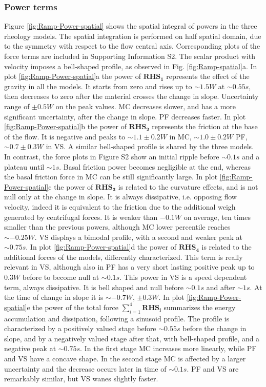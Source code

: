 \documentclass{article}
\begin{document}
\subsubsection{Power terms}
Figure \ref{fig:Ramp-Power-spatial} shows the spatial integral of powers in the three rheology models. The spatial integration is performed on half spatial domain, due to the symmetry with respect to the flow central axis. Corresponding plots of the force terms are included in Supporting Information S2. The scalar product with velocity imposes a bell-shaped profile, as observed in Fig. \ref{fig:Ramp-spatial}a. In plot \ref{fig:Ramp-Power-spatial}a the power of $\boldsymbol{RHS_1}$ represents the effect of the gravity in all the models. It starts from zero and rises up to $\sim 1.5 W$ at $\sim 0.55 s$, then decreases to zero after the material crosses the change in slope. Uncertainty range of $\pm 0.5 W$ on the peak values. MC decreases slower, and has a more significant uncertainty, after the change in slope. PF decreases faster.  In plot \ref{fig:Ramp-Power-spatial}b the power of  $\boldsymbol{RHS_2}$ represents the friction at the base of the flow. It is negative and peaks to $\sim 1.1 \pm 0.2 W$ in MC, $\sim 1.0 \pm 0.2 W$ PF, $\sim 0.7 \pm 0.3 W$ in VS. A similar bell-shaped profile is shared by the three models. In contrast, the force plots in Figure S2 show an initial ripple before $\sim 0.1 s$ and a plateau until $\sim 1 s$. Basal friction power becomes negligible at the end, whereas the basal friction force in MC can be still significantly large. In plot \ref{fig:Ramp-Power-spatial}c the power of $\boldsymbol{RHS_3}$ is related to the curvature effects, and is not null only at the change in slope. It is always dissipative, i.e. opposing flow velocity, indeed it is equivalent to the friction due to the additional weigh generated by centrifugal forces. It is weaker than $-0.1 W$ on average, ten times smaller than the previous powers, although MC lower percentile reaches $\sim -0.25 W$. VS displays a bimodal profile, with a second and weaker peak at $\sim 0.75 s$. In plot \ref{fig:Ramp-Power-spatial}d the power of $\boldsymbol{RHS_4}$ is related to the additional forces of the models, differently characterized. This term is really relevant in VS, although also in PF has a very short lasting positive peak up to $0.3 W$ before to become null at $\sim 0.1 s$. This power in VS is a speed dependent term, always dissipative. It is bell shaped and null before $\sim 0.1 s$ and after $\sim 1 s$. At the time of change in slope it is $\sim -0.7 W$, $\pm 0.3 W$. In plot \ref{fig:Ramp-Power-spatial}e the power of the total force $\sum^4_{i=1}\boldsymbol{RHS_i}$ summarizes the energy accumulation and dissipation, following a sinusoid profile. The profile is characterized by a positively valued stage before $\sim 0.55 s$ before the change in slope, and by a negatively valued stage after that, with bell-shaped profile, and a negative peak at $\sim 0.75 s$. In the first stage MC increases more linearly, while PF and VS have a concave shape. In the second stage MC is affected by a larger uncertainty and the decrease occurs later in time of $\sim 0.1 s$. PF and VS are remarkably similar, but VS wanes slightly faster.
\end{document}
